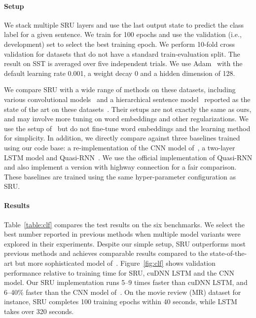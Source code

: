 \documentclass[11pt,a4paper]{article}
\begin{document}
\paragraph{Setup} We stack multiple SRU layers and use the last output state to predict the class label for a given sentence.
We train for 100 epochs and use the validation (i.e., development) set to select the best training epoch.
We perform 10-fold cross validation for datasets that do not have a standard train-evaluation split.
The result on SST is averaged over five independent trials.
We use Adam~\citep{Kingma:14adam} with the default learning rate 0.001, a weight decay 0 and a hidden dimension of 128.

We compare SRU with a wide range of methods on these datasets, including various convolutional models~\citep{kalchbrenner:2014,Kim14,zhang2015sensitivity} and a hierarchical sentence model~\citep{zhao2015self} reported as the state of the art on these datasets~\citep{conneau17}.
Their setups are not exactly the same as ours, and may involve more tuning on word embeddings and other regularizations.
We use the setup of~\citet{Kim14} but do not fine-tune word embeddings and the learning method for simplicity.
In addition, we directly compare against three baselines trained using our code base: a re-implementation of the CNN model of~\citet{Kim14}, a two-layer LSTM model and Quasi-RNN~\citep{bradbury2016quasi}.
We use the official implementation of Quasi-RNN and also implement a version with highway connection for a fair comparison.
These baselines are trained using the same hyper-parameter configuration as SRU.


\paragraph{Results} 
Table~\ref{table:clf} compares the test results on the six benchmarks. 
We select the best number reported in previous methods when multiple model variants were explored in their experiments.
Despite our simple setup, SRU outperforms most previous methods and achieves comparable results compared to the state-of-the-art but more sophisticated model of~\citet{zhao2015self}.
Figure~\ref{fig:clf} shows validation performance relative to training time for SRU, cuDNN LSTM and the CNN model.
Our SRU implementation runs 5--9 times faster than cuDNN LSTM, and 6--40\% faster than the CNN model of~\citet{Kim14}.
On the movie review (MR) dataset for instance, SRU completes 100 training epochs within 40 seconds, while LSTM takes over 320 seconds.
\end{document}
